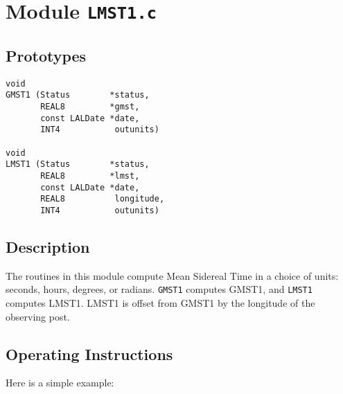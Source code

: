 \section{Module \texttt{LMST1.c}}

\subsection{Prototypes}
\begin{verbatim}
void
GMST1 (Status        *status,
       REAL8         *gmst,
       const LALDate *date,
       INT4           outunits)

void
LMST1 (Status        *status,
       REAL8         *lmst,
       const LALDate *date,
       REAL8          longitude,
       INT4           outunits)
\end{verbatim}

\subsection{Description}

The routines in this module compute Mean Sidereal Time in a choice of
units: seconds, hours, degrees, or radians. \texttt{GMST1} computes GMST1,
and \texttt{LMST1} computes LMST1.  LMST1 is offset from GMST1 by
the longitude of the observing post.

\subsection{Operating Instructions}
Here is a simple example:

